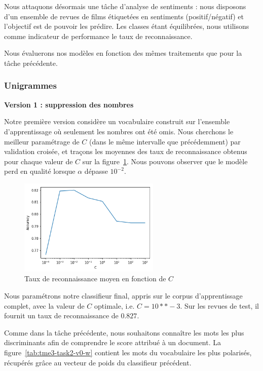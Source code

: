 \documentclass[a4paper]{article}
\newcommand{\figref}[1]{figure~\ref{#1}}
\begin{document}
Nous attaquons désormais une tâche d'analyse de sentiments : nous disposons d'un
ensemble de revues de films étiquetées en sentiments (positif/négatif) et
l'objectif est de pouvoir les prédire. Les classes étant équilibrées, nous
utilisons comme indicateur de performance le taux de reconnaissance.

Nous évaluerons nos modèles en fonction des mêmes traitements que pour la tâche
précédente. 

\subsubsection{Unigrammes}

\textbf{Version 1 : suppression des nombres}

Notre première version considère un vocabulaire construit sur l'ensemble
d'apprentissage où seulement les nombres ont été omis. Nous cherchons le
meilleur paramétrage de $C$ (dans le même intervalle que précédemment) par
validation croisée, et traçons les moyennes des taux de reconnaissance obtenus
pour chaque valeur de $C$ sur la \figref{img:tme2-task2-v0}. Nous pouvons
observer que le modèle perd en qualité lorsque $\alpha$ dépasse $10^{-2}$.

\begin{figure}[H]
	\center 
	\includegraphics[width=0.6\textwidth]{images/tme2/task2_v0.png}
    \caption{Taux de reconnaissance moyen en fonction de $C$}
    \label{img:tme2-task2-v0}
\end{figure}

Nous paramétrons notre classifieur final, appris sur le corpus d'apprentissage
complet, avec la valeur de $C$ optimale, i.e.  $C=10**-3$. Sur les revues de
test, il fournit un taux de reconnaissance de $0.827$. 

Comme dans la tâche précédente, nous souhaitons connaître les mots les plus
discriminants afin de comprendre le score attribué à un document. La
\figref{tab:tme3-task2-v0-w} contient les mots du vocabulaire les plus
polarisés, récupérés grâce au vecteur de poids du classifieur précédent.
\end{document}
